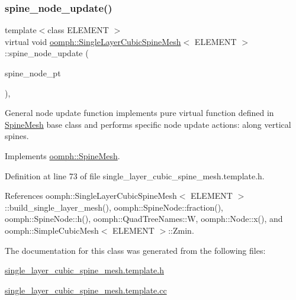\subsubsection{\texorpdfstring{spine\+\_\+node\+\_\+update()}{spine\_node\_update()}}
{\footnotesize\ttfamily template$<$class E\+L\+E\+M\+E\+NT $>$ \\
virtual void \hyperlink{classoomph_1_1SingleLayerCubicSpineMesh}{oomph\+::\+Single\+Layer\+Cubic\+Spine\+Mesh}$<$ E\+L\+E\+M\+E\+NT $>$\+::spine\+\_\+node\+\_\+update (\begin{DoxyParamCaption}\item[{\hyperlink{classoomph_1_1SpineNode}{Spine\+Node} $\ast$}]{spine\+\_\+node\+\_\+pt }\end{DoxyParamCaption})\hspace{0.3cm}{\ttfamily [inline]}, {\ttfamily [virtual]}}



General node update function implements pure virtual function defined in \hyperlink{classoomph_1_1SpineMesh}{Spine\+Mesh} base class and performs specific node update actions\+: along vertical spines. 



Implements \hyperlink{classoomph_1_1SpineMesh_aa7843aadce3c540f34442671f59eb75b}{oomph\+::\+Spine\+Mesh}.



Definition at line 73 of file single\+\_\+layer\+\_\+cubic\+\_\+spine\+\_\+mesh.\+template.\+h.



References oomph\+::\+Single\+Layer\+Cubic\+Spine\+Mesh$<$ E\+L\+E\+M\+E\+N\+T $>$\+::build\+\_\+single\+\_\+layer\+\_\+mesh(), oomph\+::\+Spine\+Node\+::fraction(), oomph\+::\+Spine\+Node\+::h(), oomph\+::\+Quad\+Tree\+Names\+::W, oomph\+::\+Node\+::x(), and oomph\+::\+Simple\+Cubic\+Mesh$<$ E\+L\+E\+M\+E\+N\+T $>$\+::\+Zmin.



The documentation for this class was generated from the following files\+:\begin{DoxyCompactItemize}
\item 
\hyperlink{single__layer__cubic__spine__mesh_8template_8h}{single\+\_\+layer\+\_\+cubic\+\_\+spine\+\_\+mesh.\+template.\+h}\item 
\hyperlink{single__layer__cubic__spine__mesh_8template_8cc}{single\+\_\+layer\+\_\+cubic\+\_\+spine\+\_\+mesh.\+template.\+cc}\end{DoxyCompactItemize}

